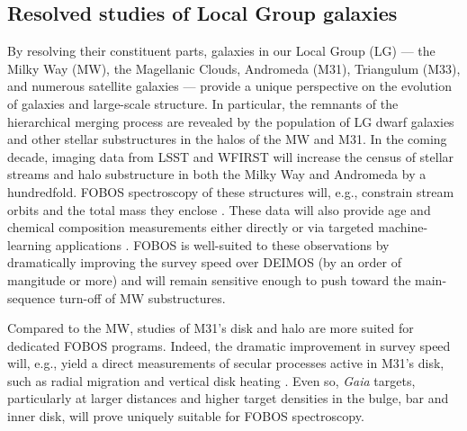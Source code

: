 
\subsection{Resolved studies of Local Group galaxies}
\label{sec:localgroup}

By resolving their constituent parts, galaxies in our Local Group
(LG) --- the Milky Way (MW), the Magellanic Clouds, Andromeda (M31),
Triangulum (M33), and numerous satellite galaxies
--- provide a unique perspective on the evolution of galaxies and
large-scale structure. In particular, the remnants of the
hierarchical merging process are revealed by the population of LG
dwarf galaxies and other stellar substructures in the halos of the MW
and M31. In the coming decade, imaging data from LSST and WFIRST will
increase the census of stellar streams and halo substructure in both
the Milky Way and Andromeda by a hundredfold. FOBOS spectroscopy of
these structures will, e.g., constrain stream orbits and the total
mass they enclose \citep{2017ApJ...836..234S}. These data will also
provide age and chemical composition measurements either directly or
via targeted machine-learning applications \citep[see Section
\ref{sec:datascience};][]{2015ApJ...808...16N, 2018arXiv180401530T,
2018arXiv180803278T}. FOBOS is well-suited to these observations by
dramatically improving the survey speed over DEIMOS (by an order of
mangitude or more) and will remain sensitive enough to push toward
the main-sequence turn-off of MW substructures.

Compared to the MW, studies of M31's disk and halo are more suited
for dedicated FOBOS programs. Indeed, the dramatic improvement in
survey speed will, e.g., yield a direct measurements of secular
processes active in M31's disk, such as radial migration and vertical
disk heating \citep{2013ApJ...779..103D, 2015ApJ...803...24D,
2019ApJ...871...11Q}. Even so, {\it Gaia} targets, particularly at
larger distances and higher target densities in the bulge, bar and
inner disk, will prove uniquely suitable for FOBOS spectroscopy.



